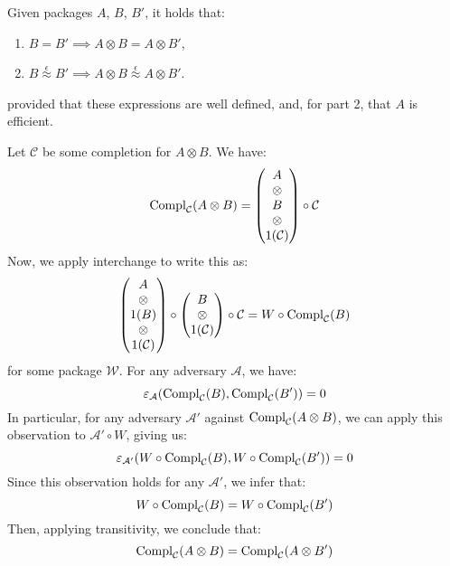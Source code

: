 \begin{lemma}
    \label{thm:pack_tensoring_respect}
    Given packages $A$, $B$, $B'$, it holds that:
    \begin{enumerate}
        \item $B = B' \implies A \otimes B = A \otimes B'$,
        \item $B \overset{\epsilon}{\approx} B' \implies A \otimes B \overset{\epsilon}{\approx} A \otimes B'$.
    \end{enumerate}
    provided that these expressions are well defined,
    and, for part 2, that $A$ is efficient.


    Let $\mathcal{C}$ be some completion for $A \otimes B$.
    We have:
    $$
    \text{Compl}_{\mathcal{C}}(A \otimes B)
    =
    \begin{pmatrix}
        A\cr
        \otimes\cr
        B\cr
        \otimes\cr
        1(\mathcal{C})
    \end{pmatrix}
    \circ \mathcal{C}
    $$
    Now, we apply interchange to write this as:
    $$
    \begin{pmatrix}
        A\cr
        \otimes\cr
        1(B)\cr
        \otimes\cr
        1(\mathcal{C})
    \end{pmatrix}
    \circ
    \begin{pmatrix}
        B\cr
        \otimes\cr
        1(\mathcal{C})
    \end{pmatrix}
    \circ \mathcal{C}
    = W \circ \text{Compl}_{\mathcal{C}}(B)
    $$
    for some package $\mathcal{W}$.
    For any adversary $\mathcal{A}$, we have:
    $$
    \varepsilon_{\mathcal{A}}(\text{Compl}_{\mathcal{C}}(B), \text{Compl}_{\mathcal{C}}(B')) = 0
    $$
    In particular, for any adversary $\mathcal{A}'$ against $\text{Compl}_{\mathcal{C}}(A \otimes B)$,
    we can apply this observation to $\mathcal{A}' \circ W$, giving us:
    $$
    \varepsilon_{\mathcal{A}'}(W \circ \text{Compl}_{\mathcal{C}}(B), W \circ \text{Compl}_{\mathcal{C}}(B')) = 0
    $$
    Since this observation holds for any $\mathcal{A}'$, we infer that:
    $$
    W \circ \text{Compl}_{\mathcal{C}}(B) =
    W \circ \text{Compl}_{\mathcal{C}}(B')
    $$
    Then, applying transitivity, we conclude that:
    $$
    \text{Compl}_{\mathcal{C}}(A \otimes B) =
    \text{Compl}_{\mathcal{C}}(A \otimes B')
    $$


\end{lemma}
